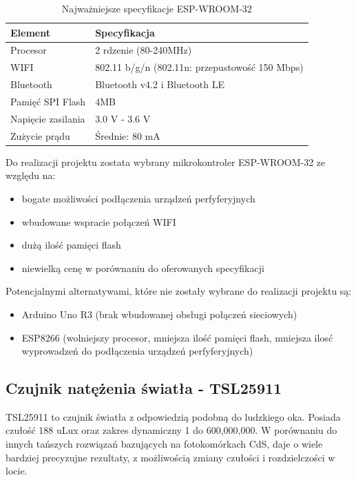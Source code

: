 \documentclass[12pt,a4paper]{article}
\begin{document}
\begin{table}[H]
    \centering
    \begin{tabular}{|l|l|}
        \hline
        Element & Specyfikacja \\
        \hline
        Procesor & 2 rdzenie (80-240MHz) \\
        \hline
        WIFI & 802.11 b/g/n (802.11n: przepustowość 150 Mbps) \\
        \hline
        Bluetooth & Bluetooth v4.2 i Bluetooth LE \\
        \hline
        Pamięć SPI Flash & 4MB \\
        \hline
        Napięcie zasilania & 3.0 V - 3.6 V \\
        \hline
        Zużycie prądu & Średnie: 80 mA \\
        \hline
    \end{tabular}
    \caption{Najważniejsze specyfikacje ESP-WROOM-32}
    \label{esp32-spec}
\end{table}

Do realizacji projektu zostata wybrany mikrokontroler ESP-WROOM-32 ze względu na:

\begin{itemize}
    \item bogate możliwości podłączenia urządzeń perfyferyjnych
    \item wbudowane wspracie połączeń WIFI
    \item dużą ilość pamięci flash
    \item niewielką cenę w porównaniu do oferowanych specyfikacji
\end{itemize}

\bigskip
Potencjalnymi alternatywami, które nie zostały wybrane do realizacji projektu są:
\begin{itemize}
    \item Arduino Uno R3 (brak wbudowanej obsługi połączeń sieciowych)
    \item ESP8266 (wolniejszy procesor, mniejsza ilość pamięci flash, mniejsza ilosć wyprowadzeń do podłączenia urządzeń perfyferyjnych)
\end{itemize}

\subsection{Czujnik natężenia światła - TSL25911}

TSL25911 to czujnik światła z odpowiedzią podobną do ludzkiego oka. Posiada czułość 188 uLux oraz zakres dynamiczny 1 do 600,000,000.
W porównaniu do innych tańszych rozwiązań bazujących na fotokomórkach CdS, daje o wiele bardziej precyzujne rezultaty, z możliwością zmiany czułości i
rozdzielczości w locie. 
\end{document}
